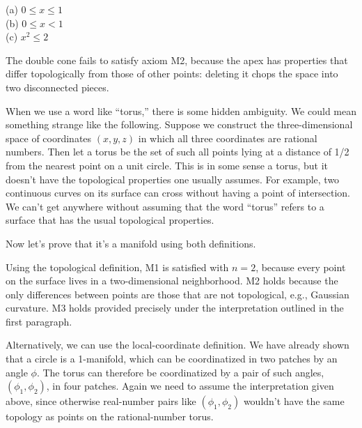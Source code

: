 (a) $0 \le x \le 1$\\
(b) $0 \le x < 1$\\
(c) $x^2 \le 2$

The double cone fails to satisfy axiom M2, because the apex has properties that differ topologically from those of
other points: deleting it chops the space into two disconnected pieces.

When we use a word like ``torus,'' there is some hidden ambiguity. We could mean something strange like the following. Suppose
we construct the three-dimensional space of coordinates $(x,y,z)$ in which all three coordinates are rational numbers. Then let
a torus be the set of such all points lying at a distance of 1/2 from the nearest point on a unit circle. This is in some sense
a torus, but it doesn't have the topological properties one usually assumes. For example, two continuous curves on its surface can cross
without having a point of intersection. We can't get anywhere without assuming that the word ``torus'' refers to a surface that
has the usual topological properties.

Now let's prove that it's a manifold using both definitions.

Using the topological definition, M1 is satisfied with $n=2$, because every point on the
surface lives in a two-dimensional neighborhood. M2 holds because the only differences between points are those that are not
topological, e.g., Gaussian curvature. M3 holds provided precisely under the interpretation outlined in the first paragraph.

Alternatively, we can use the local-coordinate definition. We have already shown that a circle
is a 1-manifold, which can be coordinatized in two patches by an angle $\phi$. The torus can therefore be coordinatized by
a pair of such angles, $(\phi_1,\phi_2)$, in four patches. Again we need to assume the interpretation given above, since
otherwise real-number pairs like $(\phi_1,\phi_2)$ wouldn't have the same topology as points on the rational-number torus.


